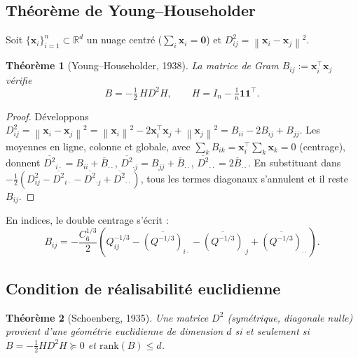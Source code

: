 \documentclass[11pt,a4paper]{article}
\newtheorem{theorem}{Théorème}[section]
\theoremstyle{definition}
\theoremstyle{remark}
\newcommand{\R}{\mathbb{R}}
\newcommand{\norm}[1]{\left\|#1\right\|}
\newcommand{\cSix}{C_6}
\begin{document}
\subsection{Théorème de Young--Householder}
\label{sec:mds-yh}

Soit $\{\mathbf{x}_i\}_{i=1}^n \subset \R^d$ un nuage centré
($\sum_i \mathbf{x}_i = \mathbf{0}$) et $D^2_{ij}=\norm{\mathbf{x}_i-\mathbf{x}_j}^2$.

\begin{theorem}[Young--Householder, 1938]
\label{thm:yh}
La matrice de Gram $B_{ij} := \mathbf{x}_i^\top \mathbf{x}_j$ vérifie
\begin{equation}
  B = -\tfrac{1}{2}\,H D^2 H,
  \qquad H = I_n - \tfrac{1}{n}\mathbf{1}\mathbf{1}^\top.
  \label{eq:B}
\end{equation}
\end{theorem}

\begin{proof}
Développons $D^2_{ij}=\norm{\mathbf{x}_i-\mathbf{x}_j}^2
= \norm{\mathbf{x}_i}^2 - 2\mathbf{x}_i^\top\mathbf{x}_j + \norm{\mathbf{x}_j}^2
= B_{ii} - 2B_{ij} + B_{jj}$.
Les moyennes en ligne, colonne et globale, avec $\sum_k B_{ik}=\mathbf{x}_i^\top\sum_k\mathbf{x}_k=0$
(centrage), donnent
$\overline{D^2}_{i\cdot}=B_{ii}+\overline{B}_{\cdot\cdot}$,
$\overline{D^2}_{\cdot j}=B_{jj}+\overline{B}_{\cdot\cdot}$,
$\overline{D^2}_{\cdot\cdot}=2\overline{B}_{\cdot\cdot}$.
En substituant dans $-\tfrac{1}{2}(D^2_{ij}-\overline{D^2}_{i\cdot}-\overline{D^2}_{\cdot j}+\overline{D^2}_{\cdot\cdot})$,
tous les termes diagonaux s'annulent et il reste $B_{ij}$.
\end{proof}

En indices, le double centrage s'écrit :
\begin{equation}
  B_{ij} = -\frac{\cSix^{1/3}}{2}\left(
    Q_{ij}^{-1/3}
    - \overline{(Q^{-1/3})}_{i\cdot}
    - \overline{(Q^{-1/3})}_{\cdot j}
    + \overline{(Q^{-1/3})}_{\cdot\cdot}
  \right).
  \label{eq:Bij}
\end{equation}

\subsection{Condition de réalisabilité euclidienne}

\begin{theorem}[Schoenberg, 1935]
\label{thm:schoenberg}
Une matrice $D^2$ (symétrique, diagonale nulle) provient d'une géométrie
euclidienne de dimension $d$ si et seulement si
$B = -\tfrac{1}{2} H D^2 H \succeq 0$ et $\mathrm{rank}(B) \leq d$.
\end{theorem}
\end{document}
